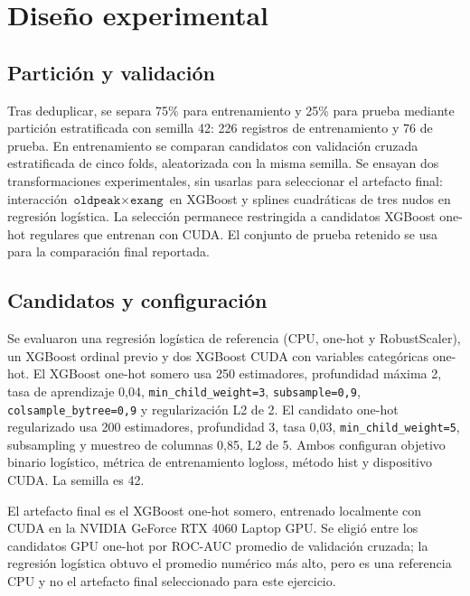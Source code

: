 \documentclass[12pt,a4paper]{article}
\begin{document}
\section{Diseño experimental}
\subsection{Partición y validación}
Tras deduplicar, se separa 75\% para entrenamiento y 25\% para prueba mediante partición estratificada con semilla 42: 226 registros de entrenamiento y 76 de prueba. En entrenamiento se comparan candidatos con validación cruzada estratificada de cinco folds, aleatorizada con la misma semilla. Se ensayan dos transformaciones experimentales, sin usarlas para seleccionar el artefacto final: interacción $\texttt{oldpeak}\times\texttt{exang}$ en XGBoost y splines cuadráticas de tres nudos en regresión logística. La selección permanece restringida a candidatos XGBoost one-hot regulares que entrenan con CUDA. El conjunto de prueba retenido se usa para la comparación final reportada.

\subsection{Candidatos y configuración}
Se evaluaron una regresión logística de referencia (CPU, one-hot y RobustScaler), un XGBoost ordinal previo y dos XGBoost CUDA con variables categóricas one-hot. El XGBoost one-hot somero usa 250 estimadores, profundidad máxima 2, tasa de aprendizaje 0,04, \texttt{min\_child\_weight=3}, \texttt{subsample=0,9}, \texttt{colsample\_bytree=0,9} y regularización L2 de 2. El candidato one-hot regularizado usa 200 estimadores, profundidad 3, tasa 0,03, \texttt{min\_child\_weight=5}, subsampling y muestreo de columnas 0,85, L2 de 5. Ambos configuran objetivo binario logístico, métrica de entrenamiento logloss, método hist y dispositivo CUDA. La semilla es 42.

El artefacto final es el XGBoost one-hot somero, entrenado localmente con CUDA en la NVIDIA GeForce RTX 4060 Laptop GPU. Se eligió entre los candidatos GPU one-hot por ROC-AUC promedio de validación cruzada; la regresión logística obtuvo el promedio numérico más alto, pero es una referencia CPU y no el artefacto final seleccionado para este ejercicio.
\end{document}
